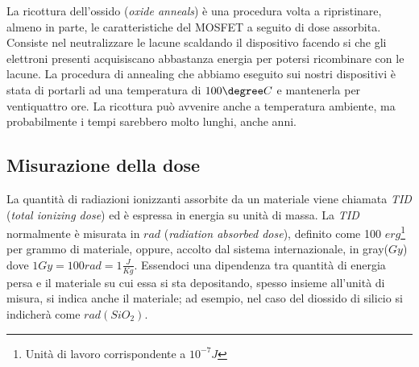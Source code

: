 \vspace{0.5cm}

La ricottura dell'ossido (\textit{oxide anneals}) è una procedura volta a ripristinare, almeno in parte, le caratteristiche del MOSFET a seguito di dose assorbita.
Consiste nel neutralizzare le lacune scaldando il dispositivo facendo si che gli elettroni presenti acquisiscano abbastanza energia per potersi ricombinare con le lacune. La procedura di annealing che abbiamo eseguito sui nostri dispositivi è stata di portarli ad una temperatura di $100\degree C$ e mantenerla per ventiquattro ore. La ricottura può avvenire anche a temperatura ambiente, ma probabilmente i tempi sarebbero molto lunghi, anche anni\cite{bib:Effetti_Radiazioni_NASA}. 

\subsection{Misurazione della dose}
La quantità di radiazioni ionizzanti assorbite da un materiale viene chiamata \textit{TID} (\textit{total ionizing dose}) ed è espressa in energia su unità di massa.
La \textit{TID} normalmente è misurata in $rad$ (\textit{radiation absorbed dose}), definito come 100 $erg$\footnote{Unità di lavoro corrispondente a $10^{-7} J$} per grammo di materiale, oppure, accolto dal sistema internazionale, in gray($Gy$) dove $1 Gy = 100rad = 1\frac{J}{Kg}$.
Essendoci una dipendenza tra quantità di energia persa e il materiale su cui essa si sta depositando, spesso insieme all'unità di misura, si indica anche il materiale; ad esempio, nel caso del diossido di silicio si indicherà come $rad(SiO_{2})$. 




